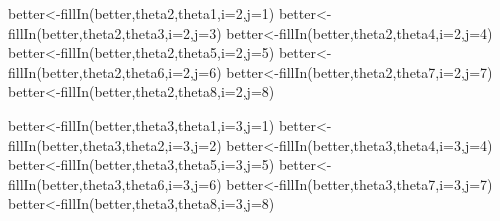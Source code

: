 \documentclass[
]{book}
\newenvironment{Shaded}{\begin{snugshade}}{\end{snugshade}}
\newcommand{\AttributeTok}[1]{\textcolor[rgb]{0.77,0.63,0.00}{#1}}
\newcommand{\DecValTok}[1]{\textcolor[rgb]{0.00,0.00,0.81}{#1}}
\newcommand{\FunctionTok}[1]{\textcolor[rgb]{0.00,0.00,0.00}{#1}}
\newcommand{\NormalTok}[1]{#1}
\newcommand{\OtherTok}[1]{\textcolor[rgb]{0.56,0.35,0.01}{#1}}
\theoremstyle{definition}
\theoremstyle{definition}
\theoremstyle{definition}
\theoremstyle{definition}
\theoremstyle{remark}
\begin{document}
\begin{Shaded}
\begin{Highlighting}[]
\NormalTok{  better}\OtherTok{\textless{}{-}}\FunctionTok{fillIn}\NormalTok{(better,theta2,theta1,}\AttributeTok{i=}\DecValTok{2}\NormalTok{,}\AttributeTok{j=}\DecValTok{1}\NormalTok{)}
\NormalTok{  better}\OtherTok{\textless{}{-}}\FunctionTok{fillIn}\NormalTok{(better,theta2,theta3,}\AttributeTok{i=}\DecValTok{2}\NormalTok{,}\AttributeTok{j=}\DecValTok{3}\NormalTok{)}
\NormalTok{  better}\OtherTok{\textless{}{-}}\FunctionTok{fillIn}\NormalTok{(better,theta2,theta4,}\AttributeTok{i=}\DecValTok{2}\NormalTok{,}\AttributeTok{j=}\DecValTok{4}\NormalTok{)}
\NormalTok{  better}\OtherTok{\textless{}{-}}\FunctionTok{fillIn}\NormalTok{(better,theta2,theta5,}\AttributeTok{i=}\DecValTok{2}\NormalTok{,}\AttributeTok{j=}\DecValTok{5}\NormalTok{)}
\NormalTok{  better}\OtherTok{\textless{}{-}}\FunctionTok{fillIn}\NormalTok{(better,theta2,theta6,}\AttributeTok{i=}\DecValTok{2}\NormalTok{,}\AttributeTok{j=}\DecValTok{6}\NormalTok{)}
\NormalTok{  better}\OtherTok{\textless{}{-}}\FunctionTok{fillIn}\NormalTok{(better,theta2,theta7,}\AttributeTok{i=}\DecValTok{2}\NormalTok{,}\AttributeTok{j=}\DecValTok{7}\NormalTok{)}
\NormalTok{  better}\OtherTok{\textless{}{-}}\FunctionTok{fillIn}\NormalTok{(better,theta2,theta8,}\AttributeTok{i=}\DecValTok{2}\NormalTok{,}\AttributeTok{j=}\DecValTok{8}\NormalTok{)}
  
\NormalTok{  better}\OtherTok{\textless{}{-}}\FunctionTok{fillIn}\NormalTok{(better,theta3,theta1,}\AttributeTok{i=}\DecValTok{3}\NormalTok{,}\AttributeTok{j=}\DecValTok{1}\NormalTok{)}
\NormalTok{  better}\OtherTok{\textless{}{-}}\FunctionTok{fillIn}\NormalTok{(better,theta3,theta2,}\AttributeTok{i=}\DecValTok{3}\NormalTok{,}\AttributeTok{j=}\DecValTok{2}\NormalTok{)}
\NormalTok{  better}\OtherTok{\textless{}{-}}\FunctionTok{fillIn}\NormalTok{(better,theta3,theta4,}\AttributeTok{i=}\DecValTok{3}\NormalTok{,}\AttributeTok{j=}\DecValTok{4}\NormalTok{)}
\NormalTok{  better}\OtherTok{\textless{}{-}}\FunctionTok{fillIn}\NormalTok{(better,theta3,theta5,}\AttributeTok{i=}\DecValTok{3}\NormalTok{,}\AttributeTok{j=}\DecValTok{5}\NormalTok{)}
\NormalTok{  better}\OtherTok{\textless{}{-}}\FunctionTok{fillIn}\NormalTok{(better,theta3,theta6,}\AttributeTok{i=}\DecValTok{3}\NormalTok{,}\AttributeTok{j=}\DecValTok{6}\NormalTok{)}
\NormalTok{  better}\OtherTok{\textless{}{-}}\FunctionTok{fillIn}\NormalTok{(better,theta3,theta7,}\AttributeTok{i=}\DecValTok{3}\NormalTok{,}\AttributeTok{j=}\DecValTok{7}\NormalTok{)}
\NormalTok{  better}\OtherTok{\textless{}{-}}\FunctionTok{fillIn}\NormalTok{(better,theta3,theta8,}\AttributeTok{i=}\DecValTok{3}\NormalTok{,}\AttributeTok{j=}\DecValTok{8}\NormalTok{)}
  


\end{Highlighting}
\end{Shaded}
\end{document}
